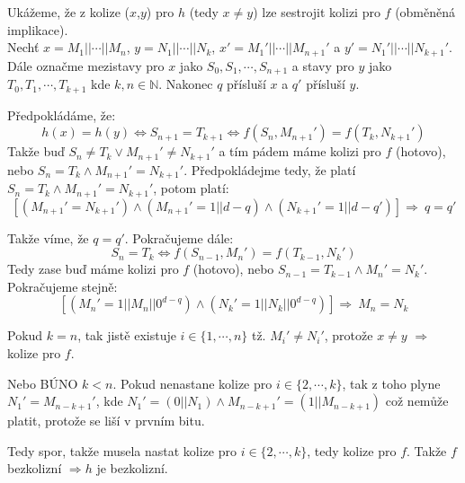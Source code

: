 \documentclass[12pt, a4paper]{article}
\begin{document}
\section{}
Ukážeme, že z kolize ($x$,$y$)  pro $h$ (tedy $x\neq y$) lze sestrojit kolizi pro $f$ (obměněná implikace).\\
Nechť $x = M_1||\cdots||M_n$, $y = N_1||\cdots||N_k$, $x' = M_1'||\cdots||M_{n+1}'$ a $y' = N_1'||\cdots||N_{k+1}'$. Dále označme mezistavy pro $x$ jako $S_0, S_1, \cdots, S_{n+1}$ a stavy pro $y$ jako $T_0, T_1, \cdots, T_{k+1}$ kde $k,n \in \mathbb{N}$. Nakonec $q$ přísluší $x$ a $q'$ přísluší $y$. 

Předpokládáme, že: 
\[h(x)=h(y) \iff S_{n+1} = T_{k+1} \iff f(S_n, M_{n+1}') = f(T_k, N_{k+1}')\]
Takže buď $S_n \neq T_k \lor M_{n+1}' \neq N_{k+1}'$ a tím pádem máme kolizi pro $f$ (hotovo), nebo $S_n = T_k \land M_{n+1}' = N_{k+1}'$. Předpokládejme tedy, že platí $S_n = T_k \land M_{n+1}' = N_{k+1}'$, potom platí:
\[ [(M_{n+1}' = N_{k+1}') \land (M_{n+1}'=1||d-q) \land (N_{k+1}'=1||d-q')] \Rightarrow\ q=q'\]

Takže víme, že $q=q'$. Pokračujeme dále: 
\[S_n = T_k \iff f(S_{n-1}, M_n') = f(T_{k-1}, N_k')\]
Tedy zase buď máme kolizi pro $f$ (hotovo), nebo $S_{n-1} = T_{k-1} \land M_n' = N_k'$. Pokračujeme stejně:
\[[(M_n'=1||M_n||0^{d-q}) \land (N_k'=1||N_k||0^{d-q})] \Rightarrow\ M_n=N_k\]

Pokud $k=n$, tak jistě existuje $i \in \{1, \cdots, n\}$ tž. $M_i' \neq N_i'$, protože $x \neq y$ $\Rightarrow$ kolize pro $f$.

Nebo BÚNO $k < n$. Pokud nenastane kolize pro $i \in \{2, \cdots, k\}$, tak z toho plyne $N_1' = M_{n-k+1}'$, kde $N_1' = (0 || N_1) \land M_{n-k+1}'=(1||M_{n-k+1})$ což nemůže platit, protože se liší v prvním bitu. 

Tedy spor, takže musela nastat kolize pro $i\in\{2, \cdots, k\}$, tedy kolize pro $f$. Takže $f$ bezkolizní $\Rightarrow h$ je bezkolizní.

\section{}
\end{document}
